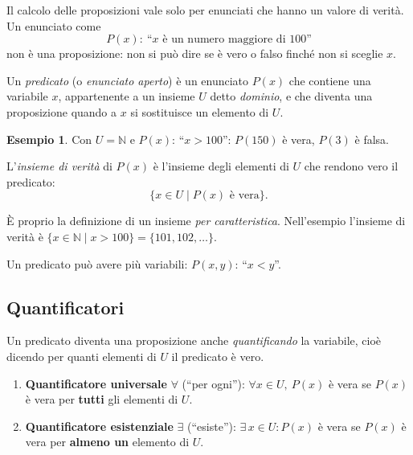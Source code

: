 \documentclass[11pt,a4paper]{article}
\theoremstyle{definition}
\newtheorem*{esempio}{Esempio}
\begin{document}
Il calcolo delle proposizioni vale solo per enunciati che hanno un valore
di verità. Un enunciato come
\[
P(x):\ \text{``$x$ è un numero maggiore di $100$''}
\]
non è una proposizione: non si può dire se è vero o falso finché non si
sceglie $x$.

\begin{definizione}
Un \emph{predicato} (o \emph{enunciato aperto}) è un enunciato $P(x)$ che
contiene una variabile $x$, appartenente a un insieme $U$ detto
\emph{dominio}, e che diventa una proposizione quando a $x$ si sostituisce
un elemento di $U$.
\end{definizione}

\begin{esempio}
Con $U = \mathbb{N}$ e $P(x)$: ``$x > 100$'': $P(150)$ è vera,
$P(3)$ è falsa.
\end{esempio}

\begin{definizione}
L'\emph{insieme di verità} di $P(x)$ è l'insieme degli elementi di $U$ che
rendono vero il predicato:
\[
\{x \in U \mid P(x) \text{ è vera}\}.
\]
\end{definizione}

È proprio la definizione di un insieme \emph{per caratteristica}. Nell'esempio
l'insieme di verità è $\{x \in \mathbb{N} \mid x > 100\} = \{101, 102, \dots\}$.

Un predicato può avere più variabili: $P(x, y)$: ``$x < y$''.

\subsection{Quantificatori}

Un predicato diventa una proposizione anche \emph{quantificando} la
variabile, cioè dicendo per quanti elementi di $U$ il predicato è vero.

\begin{definizione}
\begin{enumerate}
    \item \textbf{Quantificatore universale} $\forall$ (``per ogni''):
          $\forall x \in U,\ P(x)$ è vera se $P(x)$ è vera per
          \textbf{tutti} gli elementi di $U$.
    \item \textbf{Quantificatore esistenziale} $\exists$ (``esiste''):
          $\exists\, x \in U : P(x)$ è vera se $P(x)$ è vera per
          \textbf{almeno un} elemento di $U$.
\end{enumerate}
\end{definizione}
\end{document}
